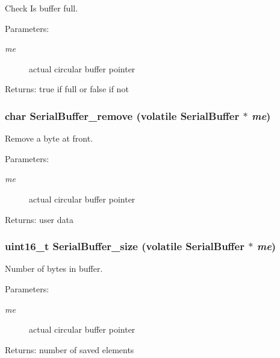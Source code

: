 Check Is buffer full. \begin{Desc}
\item[Parameters:]
\begin{description}
\item[{\em me}]actual circular buffer pointer \end{description}
\end{Desc}
\begin{Desc}
\item[Returns:]true if full or false if not \end{Desc}
\hypertarget{group__serialbuffer_g71d90db4bcb16a30c48d68c8ec1d2df2}{
\subsubsection[{SerialBuffer\_\-remove}]{\setlength{\rightskip}{0pt plus 5cm}char SerialBuffer\_\-remove (volatile {\bf SerialBuffer} $\ast$ {\em me})}}
\label{group__serialbuffer_g71d90db4bcb16a30c48d68c8ec1d2df2}


Remove a byte at front. \begin{Desc}
\item[Parameters:]
\begin{description}
\item[{\em me}]actual circular buffer pointer \end{description}
\end{Desc}
\begin{Desc}
\item[Returns:]user data \end{Desc}
\hypertarget{group__serialbuffer_g069daa68af8643f07570329943ddfed0}{
\subsubsection[{SerialBuffer\_\-size}]{\setlength{\rightskip}{0pt plus 5cm}uint16\_\-t SerialBuffer\_\-size (volatile {\bf SerialBuffer} $\ast$ {\em me})}}
\label{group__serialbuffer_g069daa68af8643f07570329943ddfed0}


Number of bytes in buffer. \begin{Desc}
\item[Parameters:]
\begin{description}
\item[{\em me}]actual circular buffer pointer \end{description}
\end{Desc}
\begin{Desc}
\item[Returns:]number of saved elements \end{Desc}



